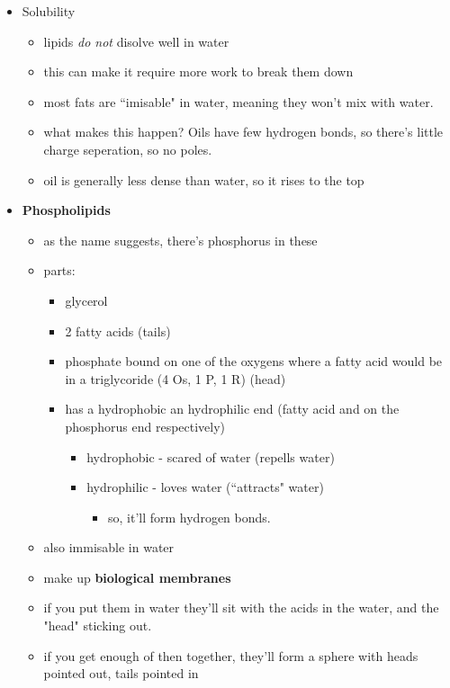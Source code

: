 \documentclass{article}
\theoremstyle{definition}
\begin{document}
\begin{itemize}
\begin{itemize}
		\end{itemize}
	\item Solubility
		\begin{itemize}
			\item lipids \textit{do not} disolve well in water
			\item this can make it require more work to break them down
			\item most fats are ``imisable" in water, meaning they won't mix with water.
			\item what makes this happen? Oils have few hydrogen bonds, so there's little charge seperation, so no poles.
			\item oil is generally less dense than water, so it rises to the top
		\end{itemize}
	\item \textbf{Phospholipids} 
		\begin{itemize}
			\item as the name suggests, there's phosphorus in these
			\item parts:
				\begin{itemize}
					\item glycerol
					\item 2 fatty acids (tails)
					\item phosphate bound on one of the oxygens where a fatty acid would be in a triglycoride (4 Os, 1 P, 1 R) (head)
					\item has a hydrophobic an hydrophilic end (fatty acid and on the phosphorus end respectively)
					\begin{itemize}
						\item hydrophobic - scared of water (repells water)
						\item hydrophilic - loves water (``attracts" water)
							\begin{itemize}
								\item so, it'll form hydrogen bonds.
							\end{itemize}
					\end{itemize}
				\end{itemize}
			\item also immisable in water
			\item make up \textbf{biological membranes} 
			\item if you put them in water they'll sit with the acids in the water, and the "head" sticking out.
			\item if you get enough of then together, they'll form a sphere with heads pointed out, tails pointed in

\end{itemize}
\end{itemize}
\end{document}
